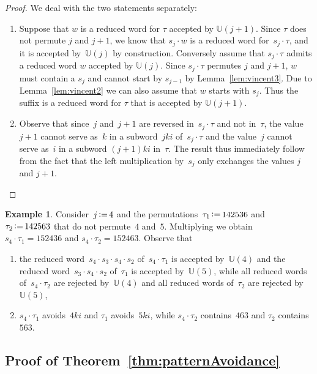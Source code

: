 \documentclass[11pt]{article}
\theoremstyle{definition}
\newtheorem{example}[theo]{Example}
\numberwithin{equation}{section}
\newcommand{\eqdef}{\mbox{\,\raisebox{0.2ex}{\scriptsize\ensuremath{\mathrm:}}\ensuremath{=}\,}}
\newcommand{\automatonU}{\mathbb{U}}
\begin{document}
\begin{proof}
We deal with the two statements separately:
\begin{enumerate} 
	\item Suppose that $w$ is a reduced word for $\tau$ accepted by $\automatonU(j+1)$. Since $\tau$ does not permute $j$ and $j+1$, we know that $s_j \cdot w$ is a reduced word for~$s_j \cdot \tau$, and it is accepted by~$\automatonU(j)$ by construction. Conversely assume that $s_j \cdot \tau$ admits a reduced word $w$ accepted by $\automatonU(j)$. Since $s_j \cdot \tau$ permutes $j$ and $j+1$, $w$ must contain a $s_j$ and cannot start by $s_{j-1}$ by Lemma~\ref{lem:vincent3}. Due to Lemma~\ref{lem:vincent2} we can also assume that $w$ starts with $s_j$. Thus the suffix is a reduced word for $\tau$ that is accepted by $\automatonU(j+1)$.
	\item Observe that since~$j$ and~$j+1$ are reversed in~$s_j \cdot \tau$ and not in~$\tau$, the value $j+1$ cannot serve as~$k$ in a subword~$jki$ of~$s_j \cdot \tau$ and the value~$j$ cannot serve as~$i$ in a subword $(j+1)ki$ in~$\tau$. The result thus immediately follow from the fact that the left multiplication by~$s_j$ only exchanges the values $j$ and $j+1$.
	\qedhere
\end{enumerate}
\end{proof}

\begin{example}\label{exm:lemVincent4}
Consider~$j \eqdef 4$ and the permutations~$\tau_1 \eqdef 142536$ and~$\tau_2 \eqdef 142563$ that do not permute~$4$ and~$5$. 
Multiplying we obtain~$s_4 \cdot \tau_1 = 152436$ and ${s_4 \cdot \tau_2 = 152463}$. Observe that
\begin{enumerate}
	\item the reduced word~$s_4 \cdot s_3 \cdot s_4 \cdot s_2$ of~$s_4 \cdot \tau_1$ is accepted by~$\automatonU(4)$ and the reduced word~$s_3 \cdot s_4 \cdot s_2$ of~$\tau_1$ is accepted by~$\automatonU(5)$, while all reduced words of~$s_4 \cdot \tau_2$ are rejected by~$\automatonU(4)$ and all reduced words of~$\tau_2$ are rejected by~$\automatonU(5)$,
	\item $s_4 \cdot \tau_1$ avoids~$4ki$ and $\tau_1$ avoids~$5ki$, while $s_4 \cdot \tau_2$ contains~$463$ and $\tau_2$ contains~$563$.
\end{enumerate}
\end{example}

\subsection{Proof of Theorem~\ref{thm:patternAvoidance}}
\end{document}
